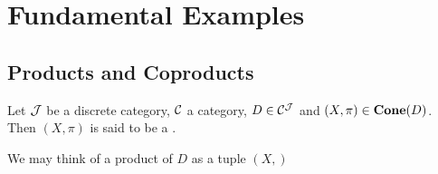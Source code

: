 \documentclass{book}
\begin{document}
	
	

	
	
	
	
	
	
	
	
	
	
	
	
	
	
	
	
	
	
	
	
	
	
	
	
	
	
	
	
	
	
	
	
	
	
	
	
	
	
	
	
	
	
	
	
	
	
	
	
	
	
	
	
	
	
	
	
	
	
	
	
	
	
	
	\section{Fundamental Examples}
	
	\subsection{Products and Coproducts}
	
	\begin{defn}
		Let $\mathcal{J}$ be a discrete category, $\mathcal{C}$ a category, $D \in \mathcal{C}^{\mathcal{J}}$ and $(X, \pi) \in \operatorname*{\text{\textbf{Cone}}}(D)$. Then $(X, \pi)$ is said to be a .
	\end{defn}
	
	\begin{note}
		We may think of a product of $D$ as a tuple $(X, )$
	\end{note}
	
	\begin{ex}
	\end{ex}
	
\end{document}
